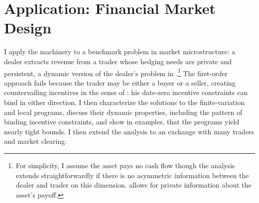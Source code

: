 \documentclass[12pt]{article}
\begin{document}

\section{Application: Financial Market Design}\label{sec:application}


I apply the machinery to a benchmark problem in market
microstructure: a dealer extracts revenue from a trader
whose hedging needs are private and persistent, a dynamic
version of the dealer's problem in
\cite{glosten1989insider}.\footnote{For simplicity, I assume the asset pays no cash flow though the analysis extends straightforwardly if there is no asymmetric information between the dealer and trader on this dimension.
\citet{glosten1989insider} allows for private information
about the asset's payoff.} The first-order approach
fails because the trader may be either a buyer or a seller, creating
countervailing incentives in the sense of
\citet{lewis1989countervailing}: his date-zero incentive constraints can
bind in either direction. I then characterize the solutions to the finite-variation and local programs, discuss their dynamic properties, including the pattern of binding incentive constraints, and show in examples, that the programs yield nearly tight bounds. I then extend the analysis to an exchange
with many traders and market clearing.%

\end{document}
